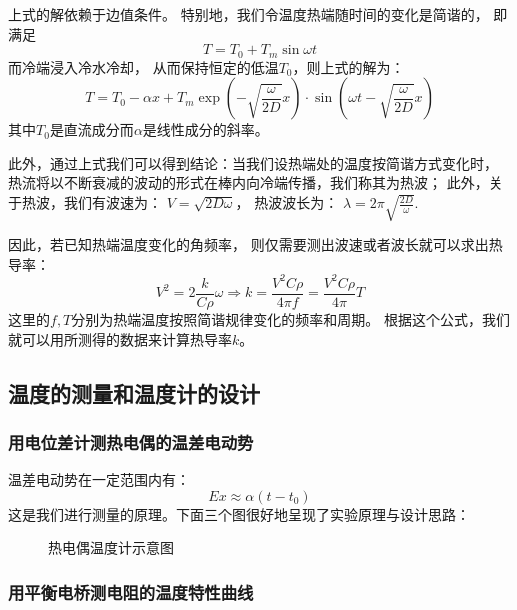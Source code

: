 \documentclass[11pt]{article}
\begin{document}
上式的解依赖于边值条件。
特别地，我们令温度热端随时间的变化是简谐的，
即满足
\begin{displaymath}
    T=T_0+T_m\sin \omega t
\end{displaymath}
而冷端浸入冷水冷却，
从而保持恒定的低温$T_0$，则上式的解为：
\begin{displaymath}
    T=T_0-\alpha x+T_m\exp \left(-\sqrt{\frac{\omega}{2D}}x\right)
    \cdot \sin \left(\omega t-\sqrt{\frac{\omega}{2D}}x\right)
\end{displaymath}其中$T_0$是直流成分而$\alpha$是线性成分的斜率。

此外，通过上式我们可以得到结论：当我们设热端处的温度按简谐方式变化时，
热流将以不断衰减的波动的形式在棒内向冷端传播，我们称其为热波；
此外，关于热波，我们有波速为：
$\displaystyle V=\sqrt{2D\omega}$，
热波波长为：
$\displaystyle \lambda=2\pi\sqrt{\frac{2D}{\omega}}$.

因此，若已知热端温度变化的角频率，
则仅需要测出波速或者波长就可以求出热导率：
\begin{displaymath}
    V^2=2\frac{k}{C\rho}\omega\Rightarrow k=\frac{V^2C\rho}{4\pi f}=\frac{V^2C\rho}{4\pi}T
\end{displaymath}
这里的$f,T$分别为热端温度按照简谐规律变化的频率和周期。
根据这个公式，我们就可以用所测得的数据来计算热导率$k$。


\subsection{温度的测量和温度计的设计}


\subsubsection{用电位差计测热电偶的温差电动势}

温差电动势在一定范围内有：
\begin{displaymath}
    Ex\approx\alpha(t-t_0)
\end{displaymath}
这是我们进行测量的原理。下面三个图很好地呈现了实验原理与设计思路：
\begin{figure}[H] 
    \centering
    \caption{热电偶温度计示意图}
\end{figure}



\subsubsection{用平衡电桥测电阻的温度特性曲线}
\end{document}
